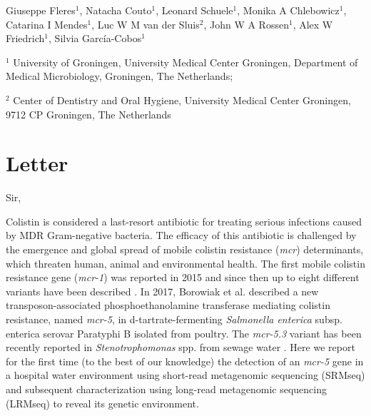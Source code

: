 Giuseppe Fleres$^1$, 
Natacha Couto$^1$, 
Leonard Schuele$^1$,
Monika A Chlebowicz$^1$,
Catarina I Mendes$^1$,
Luc W M van der Sluis$^2$, 
John W A Rossen$^1$, 
Alex W Friedrich$^1$, 
Silvia García-Cobos$^1$

$^1$ University of Groningen, University Medical Center Groningen, Department of Medical Microbiology, Groningen, The Netherlands;

$^2$ Center of Dentistry and Oral Hygiene, University
Medical Center Groningen, 9712 CP Groningen, The Netherlands

\section{Letter}

Sir,

Colistin is considered a last-resort antibiotic for treating serious infections caused by MDR Gram-negative bacteria. 
The efficacy of this antibiotic is challenged by the emergence and global spread of mobile colistin resistance (\textit{mcr}) determinants, which threaten human, animal and environmental health. 
The first mobile colistin resistance gene (\textit{mcr-1}) was reported in 2015 and since then up to eight different variants have been described \citep{wang_emergence_2018}. 
In 2017, Borowiak et al.\citep{borowiak_identification_2017} described a new transposon-associated phosphoethanolamine transferase mediating colistin resistance, named \textit{mcr-5}, in d-tartrate-fermenting \textit{Salmonella enterica} subsp. enterica serovar Paratyphi B isolated from poultry. 
The \textit{mcr-5.3} variant has been recently reported in \textit{Stenotrophomonas} spp. from sewage water \citep{li_co-occurrence_2019}.
Here we report for the first time (to the best of our knowledge) the detection of an \textit{mcr-5} gene in a hospital water environment using short-read metagenomic sequencing (SRMseq) and subsequent characterization using long-read metagenomic sequencing (LRMseq) to reveal its genetic environment.


